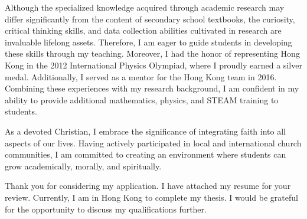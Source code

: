 \documentclass[11pt, a4paper]{awesome-cv}
\begin{document}
\begin{cvletter}
Although the specialized knowledge acquired through academic research may differ significantly from the content of secondary school textbooks, the curiosity, critical thinking skills, and data collection abilities cultivated in research are invaluable lifelong assets. Therefore, I am eager to guide students in developing these skills through my teaching. Moreover, I had the honor of representing Hong Kong in the 2012 International Physics Olympiad, where I proudly earned a silver medal. Additionally, I served as a mentor for the Hong Kong team in 2016. Combining these experiences with my research background, I am confident in my ability to provide additional mathematics, physics, and STEAM training to students.

As a devoted Christian, I embrace the significance of integrating faith into all aspects of our lives. Having actively participated in local and international church communities, I am committed to creating an environment where students can grow academically, morally, and spiritually.

Thank you for considering my application. I have attached my resume for your review. Currently, I am in Hong Kong to complete my thesis. I would be grateful for the opportunity to discuss my qualifications further.


\end{cvletter}


\makeletterclosing
\end{document}
